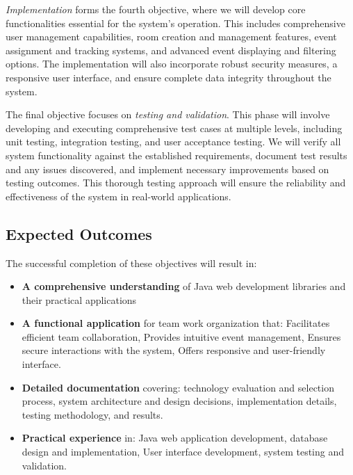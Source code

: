 \textit{Implementation} forms the fourth objective, where we will develop core functionalities essential for the system's operation.
This includes comprehensive user management capabilities, room creation and management features, event assignment and tracking systems, and advanced event displaying and filtering options.
The implementation will also incorporate robust security measures, a responsive user interface, and ensure complete data integrity throughout the system.

The final objective focuses on \textit{testing and validation}.
This phase will involve developing and executing comprehensive test cases at multiple levels, including unit testing, integration testing, and user acceptance testing.
We will verify all system functionality against the established requirements, document test results and any issues discovered, and implement necessary improvements based on testing outcomes.
This thorough testing approach will ensure the reliability and effectiveness of the system in real-world applications.
\newpage
\subsection{Expected Outcomes}\label{subsec:expected-outcomes}
The successful completion of these objectives will result in:

\begin{itemize}
    \item \textbf{A comprehensive understanding} of Java web development libraries and their practical applications

    \item \textbf{A functional application} for team work organization that:
    Facilitates efficient team collaboration,
    Provides intuitive event management,
    Ensures secure interactions with the system,
    Offers responsive and user-friendly interface.


    \item \textbf{Detailed documentation} covering: technology evaluation and selection process,
    system architecture and design decisions,
    implementation details, testing methodology, and results.


    \item \textbf{Practical experience} in: Java web application development,
    database design and implementation,
    User interface development,
    system testing and validation.
\end{itemize}
